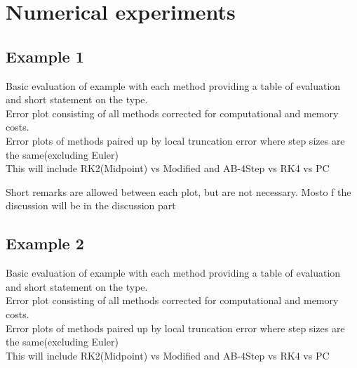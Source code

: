 \documentclass[11pt]{article}	%
\begin{document}

\section{Numerical experiments}

\subsection{Example 1}
Basic evaluation of example with each method providing a table of evaluation and short statement on the type.\\
Error plot consisting of all methods corrected for computational and memory costs.\\
Error plots of methods paired up by local truncation error where step sizes are the same(excluding Euler)   \\
\hspace{2cm} This will include RK2(Midpoint) vs Modified and AB-4Step vs RK4 vs PC

Short remarks are allowed between each plot, but are not necessary. Mosto f the discussion will be in the discussion part


\subsection{Example 2}
Basic evaluation of example with each method providing a table of evaluation and short statement on the type.\\
Error plot consisting of all methods corrected for computational and memory costs.\\
Error plots of methods paired up by local truncation error where step sizes are the same(excluding Euler)   \\
\hspace{2cm} This will include RK2(Midpoint) vs Modified and AB-4Step vs RK4 vs PC
\end{document}
